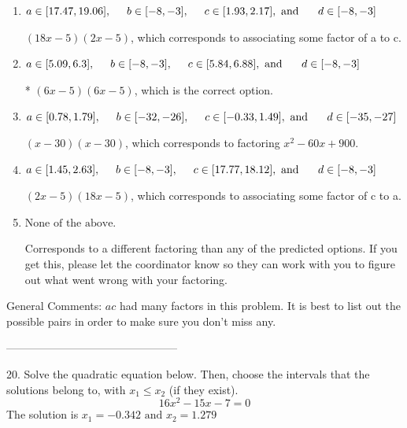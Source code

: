 \documentclass{extbook}[14pt]
\begin{document}
\begin{enumerate}[label=\Alph*.] 
\item $ a \in [17.47, 19.06], \hspace*{5mm} b \in [-8, -3], \hspace*{5mm} c \in [1.93, 2.17], \text{ and } \hspace*{5mm} d \in [-8, -3] $ 

  $(18x -5)(2x -5)$, which corresponds to associating some factor of a to c. 
\item $ a \in [5.09, 6.3], \hspace*{5mm} b \in [-8, -3], \hspace*{5mm} c \in [5.84, 6.88], \text{ and } \hspace*{5mm} d \in [-8, -3] $ 

 * $(6x -5)(6x -5)$, which is the correct option. 
\item $ a \in [0.78, 1.79], \hspace*{5mm} b \in [-32, -26], \hspace*{5mm} c \in [-0.33, 1.49], \text{ and } \hspace*{5mm} d \in [-35, -27] $ 

  $(x -30)(x -30)$, which corresponds to factoring $x^{2} -60 x + 900$. 
\item $ a \in [1.45, 2.63], \hspace*{5mm} b \in [-8, -3], \hspace*{5mm} c \in [17.77, 18.12], \text{ and } \hspace*{5mm} d \in [-8, -3] $ 

  $(2x -5)(18x -5)$, which corresponds to associating some factor of c to a. 
\item $ \text{None of the above.} $ 

  Corresponds to a different factoring than any of the predicted options. If you get this, please let the coordinator know so they can work with you to figure out what went wrong with your factoring. 
\end{enumerate} 
 
General Comments: $ac$ had many factors in this problem. It is best to list out the possible pairs in order to make sure you don't miss any.

-----------------------------------------------

20. Solve the quadratic equation below. Then, choose the intervals that the solutions belong to, with $x_1 \leq x_2$ (if they exist).
\[ 16x^{2} -15 x -7 = 0 \] 
The solution is $ x_1 = -0.342 \text{ and } x_2 = 1.279 $ 
\end{document}
